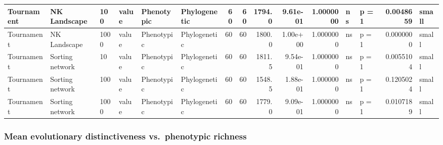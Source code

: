 \documentclass[]{book}
\begin{document}
\begin{table}
\begin{tabular}[t]{l|l|l|l|l|l|r|r|r|r|r|l|l|r|l}
\hline
Tournament & NK Landscape & 100 & value & Phenotypic & Phylogenetic & 60 & 60 & 1794.0 & 9.61e-01 & 1.0000000 & ns & p = 1 & 0.0048659 & small\\
\hline
Tournament & NK Landscape & 1000 & value & Phenotypic & Phylogenetic & 60 & 60 & 1800.0 & 1.00e+00 & 1.0000000 & ns & p = 1 & 0.0000000 & small\\
\hline
Tournament & Sorting network & 10 & value & Phenotypic & Phylogenetic & 60 & 60 & 1811.5 & 9.54e-01 & 1.0000000 & ns & p = 1 & 0.0055104 & small\\
\hline
Tournament & Sorting network & 100 & value & Phenotypic & Phylogenetic & 60 & 60 & 1548.5 & 1.88e-01 & 1.0000000 & ns & p = 1 & 0.1205024 & small\\
\hline
Tournament & Sorting network & 1000 & value & Phenotypic & Phylogenetic & 60 & 60 & 1779.0 & 9.09e-01 & 1.0000000 & ns & p = 1 & 0.0107189 & small\\
\hline
\end{tabular}
\end{table}

\hypertarget{mean-evolutionary-distinctiveness-vs.phenotypic-richness-1}{%
\subsubsection{Mean evolutionary distinctiveness vs.~phenotypic richness}\label{mean-evolutionary-distinctiveness-vs.phenotypic-richness-1}}
\end{document}
